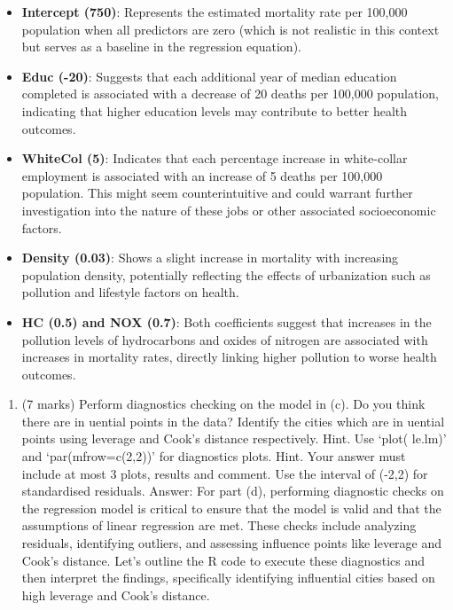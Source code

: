 \documentclass[
]{article}
\providecommand{\tightlist}{%
  \setlength{\itemsep}{0pt}\setlength{\parskip}{0pt}}
\begin{document}
\begin{itemize}
\tightlist
\item
  \textbf{Intercept (750)}: Represents the estimated mortality rate per
  100,000 population when all predictors are zero (which is not
  realistic in this context but serves as a baseline in the regression
  equation).
\item
  \textbf{Educ (-20)}: Suggests that each additional year of median
  education completed is associated with a decrease of 20 deaths per
  100,000 population, indicating that higher education levels may
  contribute to better health outcomes.
\item
  \textbf{WhiteCol (5)}: Indicates that each percentage increase in
  white-collar employment is associated with an increase of 5 deaths per
  100,000 population. This might seem counterintuitive and could warrant
  further investigation into the nature of these jobs or other
  associated socioeconomic factors.
\item
  \textbf{Density (0.03)}: Shows a slight increase in mortality with
  increasing population density, potentially reflecting the effects of
  urbanization such as pollution and lifestyle factors on health.
\item
  \textbf{HC (0.5) and NOX (0.7)}: Both coefficients suggest that
  increases in the pollution levels of hydrocarbons and oxides of
  nitrogen are associated with increases in mortality rates, directly
  linking higher pollution to worse health outcomes.
\end{itemize}

\begin{enumerate}
\def\labelenumi{(\alph{enumi})}
\setcounter{enumi}{3}
\tightlist
\item
  (7 marks) Perform diagnostics checking on the model in (c). Do you
  think there are in uential points in the data? Identify the cities
  which are in uential points using leverage and Cook's distance
  respectively. Hint. Use `plot( le.lm)' and `par(mfrow=c(2,2))' for
  diagnostics plots. Hint. Your answer must include at most 3 plots,
  results and comment. Use the interval of (-2,2) for standardised
  residuals. Answer: For part (d), performing diagnostic checks on the
  regression model is critical to ensure that the model is valid and
  that the assumptions of linear regression are met. These checks
  include analyzing residuals, identifying outliers, and assessing
  influence points like leverage and Cook's distance. Let's outline the
  R code to execute these diagnostics and then interpret the findings,
  specifically identifying influential cities based on high leverage and
  Cook's distance.
\end{enumerate}
\end{document}
